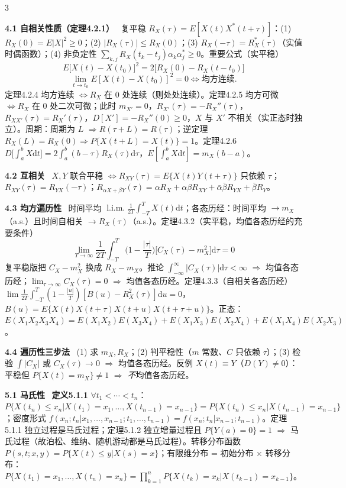 \documentclass[UTF8,a4paper]{ctexart}
\newcommand{\Sec}[1]{\par\vspace{1.4pt}{\bfseries\color{blue!65!black}\small #1}\par\vspace{0.4pt}}
\newcommand{\T}[1]{{\bfseries #1}\ }
\newcommand{\B}[1]{\textbf{#1}}
\newcommand{\Hi}[1]{\textcolor{red!70!black}{#1}}
\newcommand{\dd}{\mathrm{d}}
\newcommand{\lima}{\mathop{\mathrm{l.i.m.}}}
\begin{document}
\begin{multicols}{3}
\Sec{第4章 平稳随机过程}

\T{4.1 自相关性质（定理4.2.1）} 复平稳 $R_X(\tau)=E[X(t)X^*(t+\tau)]$：(1) $R_X(0)=E|X|^2\ge0$；(2) $|R_X(\tau)|\le R_X(0)$；(3) $R_X(-\tau)=R_X^*(\tau)$（实值时偶函数）；(4) 非负定性 $\sum_{k,j}R_X(t_k-t_j)\alpha_k\alpha_j^*\ge0$。\Hi{重要公式（实平稳）}
$$E\big[X(t)-X(t_0)\big]^2=2\big[R_X(0)-R_X(t-t_0)\big]$$$$\lim_{t\to t_0}E[X(t)-X(t_0)]^2=0\iff\text{均方连续}.$$
\Hi{定理4.2.4} 均方连续 $\iff R_X$ 在 $0$ 处连续（则处处连续）。\Hi{定理4.2.5} 均方可微 $\iff R_X$ 在 $0$ 处二次可微；此时 $m_{X'}=0$，$R_{X'}(\tau)=-R_X''(\tau)$，$R_{XX'}(\tau)=R_X'(\tau)$，$D[X']=-R_X''(0)\ge0$，$X$ 与 $X'$ 不相关（实正态时独立）。周期：周期为 $L$ $\Rightarrow R(\tau+L)=R(\tau)$；逆定理 $R_X(L)=R_X(0)\Rightarrow P\{X(t+L)=X(t)\}=1$。\Hi{定理4.2.6} $D\big[\int_a^bX\dd t\big]=2\int_a^b(b-\tau)R_X(\tau)\dd\tau$，$E[\int_a^bX\dd t]=m_X(b-a)$。

\T{4.2 互相关} $X,Y$ 联合平稳 $\iff R_{XY}(\tau)=E\{X(t)Y(t+\tau)\}$ 只依赖 $\tau$；$R_{XY}(\tau)=R_{YX}(-\tau)$；$R_{\alpha X+\beta Y}(\tau)=\alpha R_X+\alpha\beta R_{XY}+\bar\alpha\bar\beta R_{YX}+\bar\beta R_Y$。

\T{4.3 均方遍历性} 时间平均 $\lima\frac1{2T}\int_{-T}^TX(t)\dd t$；各态历经：时间平均 $\to m_X$（a.s.）且时间自相关 $\to R_X(\tau)$（a.s.）。\Hi{定理4.3.2（实平稳，均值各态历经的充要条件）}
$$\lim_{T\to\infty}\frac1{2T}\int_{-T}^T\Big(1-\frac{|\tau|}{T}\Big)\big[C_X(\tau)-m_X^2\big]\dd\tau=0$$
复平稳版把 $C_X-m_X^2$ 换成 $R_X-m_X$。\Hi{推论} $\int_{-\infty}^{\infty}|C_X(\tau)|\dd\tau<\infty$ $\Rightarrow$ 均值各态历经；$\lim_{\tau\to\infty}C_X(\tau)=0$ $\Rightarrow$ 均值各态历经。\Hi{定理4.3.3（自相关各态历经）} $\lim\frac1{2T}\int_{-T}^T(1-\frac{|u|}{T})[B(u)-R_X^2(\tau)]\dd u=0$，$B(u)=E\{X(t)X(t+\tau)X(t+u)X(t+\tau+u)\}$。正态：$E(X_1X_2X_3X_4)=E(X_1X_2)E(X_3X_4)+E(X_1X_3)E(X_2X_4)+E(X_1X_4)E(X_2X_3)$。

\T{4.4 遍历性三步法} (1) 求 $m_X,R_X$；(2) 判平稳性（$m$ 常数、$C$ 只依赖 $\tau$）；(3) 检验 $\int|C_X|$ 或 $C_X(\tau)\to0$ $\Rightarrow$ 均值各态历经。\Hi{反例} $X(t)\equiv Y$（$D(Y)\ne0$）：平稳但 $P\{X(t)=m_X\}\ne1$ $\Rightarrow$ \emph{不}均值各态历经。

\Sec{第5章 马尔可夫过程}

\T{5.1 马氏性} \B{定义5.1.1} $\forall t_1<\cdots<t_n$：$P\{X(t_n)\le x_n|X(t_1)=x_1,\dots,X(t_{n-1})=x_{n-1}\}=P\{X(t_n)\le x_n|X(t_{n-1})=x_{n-1}\}$；密度形式 $f(x_n;t_n|x_1,\dots,x_{n-1};t_1,\dots,t_{n-1})=f(x_n;t_n|x_{n-1};t_{n-1})$。\Hi{定理5.1.1} 独立过程是马氏过程；\Hi{定理5.1.2} 独立增量过程且 $P\{Y(a)=0\}=1$ $\Rightarrow$ 马氏过程（故泊松、维纳、随机游动都是马氏过程）。转移分布函数 $P(s,t;x,y)=P\{X(t)\le y|X(s)=x\}$；\Hi{有限维分布 = 初始分布 × 转移分布}：$P\{X(t_1)=x_1,\dots,X(t_n)=x_n\}=\prod_{k=1}^nP\{X(t_k)=x_k|X(t_{k-1})=x_{k-1}\}$。


\end{multicols}
\end{document}
